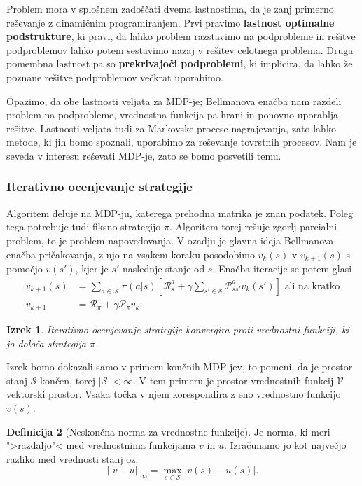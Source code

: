 \documentclass[12pt,a4paper]{amsart}
\theoremstyle{definition} %
\newtheorem{definicija}{Definicija}[section]
\theoremstyle{plain} %
\newtheorem{izrek}[definicija]{Izrek}
\begin{document}
Problem mora v splošnem zadoščati dvema lastnostima, da je zanj primerno reševanje z dinamičnim 
programiranjem. Prvi pravimo \textbf{lastnost optimalne podstrukture}, ki pravi, da lahko problem 
razstavimo na podprobleme in rešitve podproblemov lahko potem sestavimo nazaj v rešitev celotnega 
problema. Druga pomembna lastnost pa so \textbf{prekrivajoči podproblemi}, ki implicira, da lahko 
že poznane rešitve podproblemov večkrat uporabimo.

Opazimo, da obe lastnosti veljata za MDP-je; Bellmanova enačba nam razdeli problem na 
podprobleme, vrednostna funkcija pa hrani in ponovno uporablja rešitve. Lastnosti veljata tudi 
za Markovske procese nagrajevanja, zato lahko metode, ki jih bomo spoznali, uporabimo za reševanje
tovrstnih procesov. Nam je seveda v interesu reševati MDP-je, zato se bomo posvetili temu.

\subsubsection{Iterativno ocenjevanje strategije}
Algoritem deluje na MDP-ju, katerega prehodna matrika je znan podatek. Poleg tega potrebuje tudi 
fiksno strategijo $\pi$. Algoritem torej rešuje zgorlj parcialni problem, to je problem 
napovedovanja. V ozadju je glavna ideja Bellmanova enačba pričakovanja, z njo na vsakem koraku 
posodobimo $v_k(s)$ v $v_{k+1}(s)$ s pomočjo $v(s')$, kjer je $s'$
naslednje stanje od $s$. Enačba iteracije se potem glasi 
\begin{align*}
    v_{k+1}(s) &= \sum_{a \in \mathcal{A}} \pi(a|s) \left[ \mathcal{R}_s^a + 
        \gamma \sum_{s' \in \mathcal{S}} \mathcal{P}_{ss'}^a v_k(s') \right] \text{ ali na kratko}\\
    v_{k+1} &= \mathcal{R}_\pi + \gamma \mathcal{P}_\pi v_k.
\end{align*}

\begin{izrek}\label{ios}
    Iterativno ocenjevanje strategije konvergira proti vrednostni funkciji, ki jo določa strategija 
    $\pi$.
\end{izrek}

Izrek bomo dokazali samo v primeru končnih MDP-jev, to pomeni, da je prostor stanj $\mathcal{S}$ 
končen, torej $|\mathcal{S}| < \infty$. V tem primeru je prostor vrednostnih funkcij $\mathcal{V}$
vektorski prostor. Vsaka točka v njem korespondira z eno vrednostno funkcijo $v(s)$.

\begin{definicija}[Neskončna norma za vrednostne funkcije]
    Je norma, ki meri ">razdaljo"< med vrednostnima funkcijama $v$ in $u$. Izračunamo jo kot 
    največjo razliko med vrednosti stanj oz. 
    $$
    ||v - u||_\infty = \max_{s \in \mathcal{S}} |v(s) - u(s)|.
    $$
\end{definicija}
\end{document}
